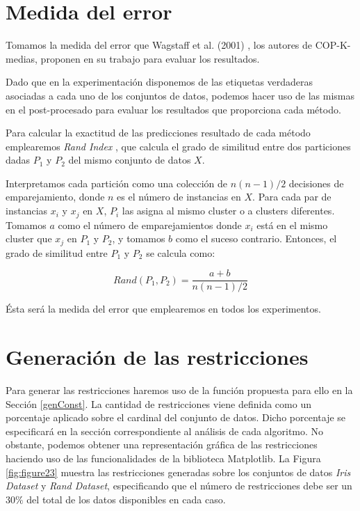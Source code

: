 \section{Medida del error}

Tomamos la medida del error que Wagstaff et al. (2001) \cite{Wagstaff:2001b}, los autores de COP-K-medias, proponen en su trabajo para evaluar los resultados.

Dado que en la experimentación disponemos de las etiquetas verdaderas asociadas a cada uno de los conjuntos de datos, podemos hacer uso de las mismas en el post-procesado para evaluar los resultados que proporciona cada método.

Para calcular la exactitud de las predicciones resultado de cada método emplearemos \textit{Rand Index} \cite{Rand:1971}, que calcula el grado de similitud entre dos particiones dadas $P_1$ y $P_2$ del mismo conjunto de datos $X$.

Interpretamos cada partición como una colección de $n (n-1) / 2$ decisiones de emparejamiento, donde $n$ es el número de instancias en $X$. Para cada par de instancias $x_i$ y $x_j$ en $X$, $P_i$ las asigna al mismo cluster o a clusters diferentes. Tomamos $a$ como el número de emparejamientos donde $x_i$ está en el mismo cluster que $x_j$ en $P_1$ y $P_2$, y tomamos $b$ como el suceso contrario. Entonces, el grado de similitud entre $P_1$ y $P_2$ se calcula como:

\begin{equation}
Rand(P_1, P_2) = \frac{a + b}{n (n-1) / 2}
\label{eqn70}
\end{equation}

Ésta será la medida del error que emplearemos en todos los experimentos.

\section{Generación de las restricciones}

Para generar las restricciones haremos uso de la función propuesta para ello en la Sección \ref{genConst}. La cantidad de restricciones viene definida como un porcentaje aplicado sobre el cardinal del conjunto de datos. Dicho porcentaje se especificará en la sección correspondiente al análisis de cada algoritmo. No obstante, podemos obtener una representación gráfica de las restricciones haciendo uso de las funcionalidades de la biblioteca Matplotlib. La Figura \ref{fig:figure23} muestra las restricciones generadas sobre los conjuntos de datos \textit{Iris Dataset} y \textit{Rand Dataset}, especificando que el número de restricciones debe ser un $30\%$ del total de los datos disponibles en cada caso.

